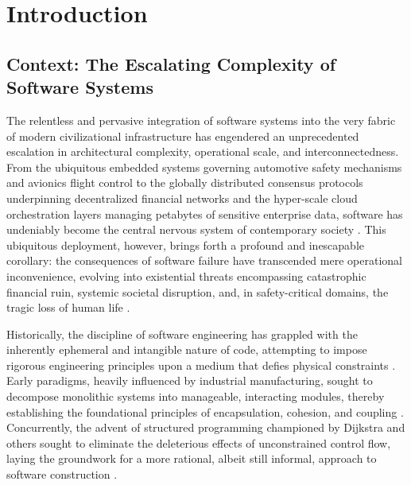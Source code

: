 \chapter{Introduction}
\label{ch:introduction}

\section{Context: The Escalating Complexity of Software Systems}
\label{sec:intro_context}
The relentless and pervasive integration of software systems into the very fabric of modern civilizational infrastructure has engendered an unprecedented escalation in architectural complexity, operational scale, and interconnectedness. From the ubiquitous embedded systems governing automotive safety mechanisms and avionics flight control to the globally distributed consensus protocols underpinning decentralized financial networks and the hyper-scale cloud orchestration layers managing petabytes of sensitive enterprise data, software has undeniably become the central nervous system of contemporary society \cite{brooks1987no, sommerville2011software}. This ubiquitous deployment, however, brings forth a profound and inescapable corollary: the consequences of software failure have transcended mere operational inconvenience, evolving into existential threats encompassing catastrophic financial ruin, systemic societal disruption, and, in safety-critical domains, the tragic loss of human life \cite{leveson1995safeware, neumann1995computer}. 

Historically, the discipline of software engineering has grappled with the inherently ephemeral and intangible nature of code, attempting to impose rigorous engineering principles upon a medium that defies physical constraints \cite{dijkstra1968letters}. Early paradigms, heavily influenced by industrial manufacturing, sought to decompose monolithic systems into manageable, interacting modules, thereby establishing the foundational principles of encapsulation, cohesion, and coupling \cite{parnas1972criteria}. Concurrently, the advent of structured programming championed by Dijkstra and others sought to eliminate the deleterious effects of unconstrained control flow, laying the groundwork for a more rational, albeit still informal, approach to software construction \cite{dijkstra1968goto}. 

